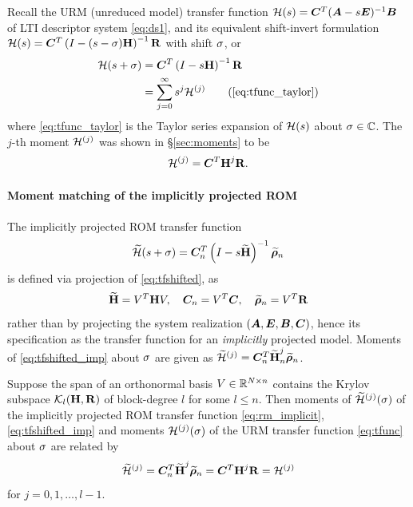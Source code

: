 Recall the URM (unreduced model) transfer function $\mathcal{H}(s)=\bm{C}^T(\bm{A}-s \bm{E})^{-1} \bm{B}$ of LTI descriptor system \eqref{eq:ds1}, and its equivalent shift-invert formulation 
$\mathcal{H}(s)=\bm{C}^T\left(I-(s-\sigma)\textbf{\textup{H}}\right)^{-1}\textbf{\textup{R}}$ with shift $\sigma$, or 
\begin{align}
\tf(s+\xp)&=\CC^T\left(I-s\H\right)^{-1}\RR \label{eq:tfshifted}\\
&= \sum_{j=0}^\infty s^j \mo{j}\tag{\ref{eq:tfunc_taylor}}
\end{align}
        where \eqref{eq:tfunc_taylor} is the Taylor series expansion of $\mathcal{H}(s)$ about $\sigma\in\mathbb{C}$.  The $j$-th moment $\mathcal{H}^{(j)}$ was shown in \S\ref{sec:moments} to be
\begin{equation}
\mathcal{H}^{(j)} =\bm{C}^T \textbf{\textup{H}}^j \textbf{\textup{R}}.
\end{equation}

\paragraph{Moment matching of the implicitly projected ROM}
The implicitly projected ROM transfer function  
\begin{equation}
\widetilde{\mathcal{H}}(s+\sigma) =\bm{C}_n^T\left(I-s\widetilde{\textbf{\textup{H}}}\right)^{-1}\widetilde{\boldsymbol{\rho}}_n
\label{eq:tfshifted_imp}
\end{equation}
is defined via projection of \eqref{eq:tfshifted}, as
\begin{equation}
\widetilde{\textbf{\textup{H}}} = V^T \textbf{\textup{H}} V, \quad \bm{C}_n = V^T \bm{C}, \quad \widetilde{\boldsymbol{\rho}}_n = V^T \textbf{\textup{R}}
\label{eq:imp_projections}
\end{equation}
rather than by projecting the system realization $(\bm{A},\bm{E},\bm{B},\bm{C})$, hence its specification as the transfer function for an \emph{implicitly} projected model. Moments of \eqref{eq:tfshifted_imp} about $\sigma$ are given as $\widetilde{\mathcal{H}}^{(j)} = \bm{C}_n^T \widetilde{\textbf{\textup{H}}}^j_n \widetilde{\boldsymbol{\rho}}_n$.

\bigskip
\begin{theorem}
\label{thm:implicit_ROM_moment_matching}
Suppose the span of an orthonormal basis $V\in\mathbb{R}^{N\times n}$ contains the Krylov subspace $\mathcal{K}_{l}({\textbf{\textup{H}}},{\textbf{\textup{R}}})$ of block-degree $l$ for some $l\leq n$.  Then moments of $\widetilde{\mathcal{H}}^{(j)}(\sigma)$ of the implicitly projected ROM transfer function  \eqref{eq:rm_implicit}, \eqref{eq:tfshifted_imp} and moments $\mathcal{H}^{(j)}(\sigma)$ of the URM transfer function \eqref{eq:tfunc} about $\sigma$ are related by
\begin{equation}
\widetilde{\mathcal{H}}^{(j)} = \bm{C}_n^T \widetilde{\textbf{\textup{H}}}^j \widetilde{\boldsymbol{\rho}}_n =  \bm{C}^T \textbf{\textup{H}}^j \textbf{\textup{R}} = \mathcal{H}^{(j)}
\end{equation}
for $j=0,1,\ldots,l-1$. 
\end{theorem}

